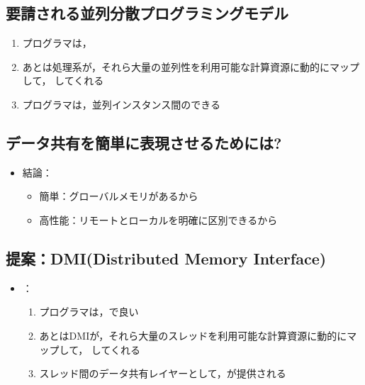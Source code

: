 \documentclass[25pt,papersize,landscape]{jsarticle}
\begin{document}

\subsection{要請される並列分散プログラミングモデル}

\begin{enumerate}
\item プログラマは，
\item あとは処理系が，それら大量の並列性を利用可能な計算資源に動的にマップして，
  してくれる
\item プログラマは，並列インスタンス間のできる
\end{enumerate}

\subsection{データ共有を簡単に表現させるためには?}

\begin{itemize}
\item 結論：
  \begin{itemize}
  \item 簡単：グローバルメモリがあるから
  \item 高性能：リモートとローカルを明確に区別できるから
  \end{itemize}
\end{itemize}

\subsection{提案：DMI(Distributed Memory Interface)}

\begin{itemize}
\item {}：
  \begin{enumerate}
  \item プログラマは，で良い
  \item あとはDMIが，それら大量のスレッドを利用可能な計算資源に動的にマップして，
    してくれる
  \item スレッド間のデータ共有レイヤーとして，が提供される
  \end{enumerate}
\end{itemize}
\end{document}
